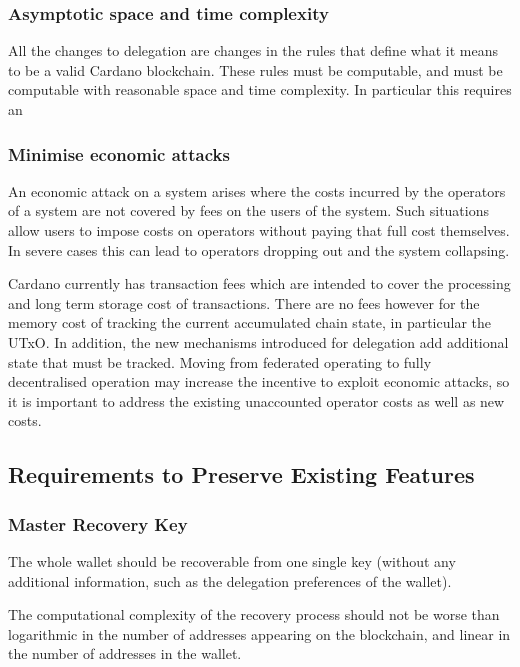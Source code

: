 \documentclass[11pt,a4paper]{article}
\begin{document}
\subsubsection{Asymptotic space and time
complexity}\label{asymptotic-space-and-time-complexity}

All the changes to delegation are changes in the rules that define what
it means to be a valid Cardano blockchain. These rules must be
computable, and must be computable with reasonable space and time
complexity. In particular this requires an

\subsubsection{Minimise economic
attacks}\label{minimise-economic-attacks}

An economic attack on a system arises where the costs incurred by the
operators of a system are not covered by fees on the users of the
system. Such situations allow users to impose costs on operators without
paying that full cost themselves. In severe cases this can lead to
operators dropping out and the system collapsing.

Cardano currently has transaction fees which are intended to cover the
processing and long term storage cost of transactions. There are no fees
however for the memory cost of tracking the current accumulated chain
state, in particular the UTxO. In addition, the new mechanisms
introduced for delegation add additional state that must be tracked.
Moving from federated operating to fully decentralised operation may
increase the incentive to exploit economic attacks, so it is important
to address the existing unaccounted operator costs as well as new costs.

\subsection{Requirements to Preserve Existing
Features}\label{requirements-to-preserve-existing-features}

\subsubsection{Master Recovery Key}\label{master-recovery-key}

The whole wallet should be recoverable from one single key (without any
additional information, such as the delegation preferences of the
wallet).

The computational complexity of the recovery process should not be worse
than logarithmic in the number of addresses appearing on the blockchain,
and linear in the number of addresses in the wallet.
\end{document}
